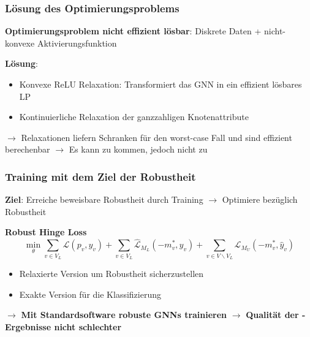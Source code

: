 \documentclass{beamer}
\begin{document}
\begin{frame}
  \frametitle{Lösung des Optimierungsproblems}
  \textbf{Optimierungsproblem nicht effizient lösbar}:\newline 
  Diskrete Daten + nicht-konvexe Aktivierungsfunktion\newline

  \textbf{Lösung}:
  \begin{itemize}
    \item Konvexe ReLU Relaxation: Transformiert das GNN in ein effizient lösbares LP
    \item Kontinuierliche Relaxation der ganzzahligen Knotenattribute
  \end{itemize}

  $\rightarrow$ Relaxationen liefern Schranken für den worst-case Fall und sind effizient berechenbar\newline
  $\rightarrow$ Es kann zu  kommen, jedoch nicht zu 
\end{frame}

\begin{frame}
  \frametitle{Training mit dem Ziel der Robustheit}

  \textbf{Ziel}: Erreiche beweisbare Robustheit durch Training\newline
  $\rightarrow$ Optimiere bezüglich Robustheit

  \textbf{Robust Hinge Loss}
  \[
  \min_{\theta} \sum_{v \in V_L} \mathcal{L}(p_v, y_v) + \sum_{v \in V_L} \mathcal{\hat{L}}_{M_L} (-m^{\ast}_v, y_v)
  + \sum_{v \in V \backslash V_L} \mathcal{\hat{L}}_{M_U} (-m^{\ast}_v, \hat{y}_v)
  \]

  \begin{itemize}
    \item Relaxierte Version um Robustheit sicherzustellen
    \item Exakte Version für die Klassifizierung
  \end{itemize}  

  $\rightarrow$ \textbf{Mit Standardsoftware robuste GNNs trainieren}\newline
  $\rightarrow$ \textbf{Qualität der -Ergebnisse nicht schlechter}
\end{frame}
\end{document}

